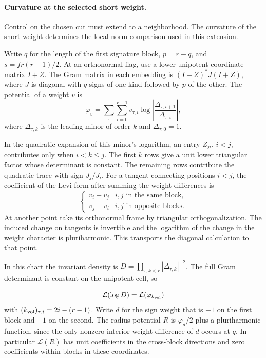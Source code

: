 \paragraph{Curvature at the selected short weight.}
\hypertarget{source-slice-short-analytic}{}

Control on the chosen cut must extend to a neighborhood. The curvature of the short weight determines the local norm comparison used in this extension.

Write \(q\) for the length of the first signature block,
\(p=r-q\), and \(s=fr(r-1)/2\). At an orthonormal flag,
use a lower unipotent coordinate matrix \(I+Z\). The
Gram matrix in each embedding is \((I+Z)^*J(I+Z)\), where
\(J\) is diagonal with \(q\) signs of one kind followed by
\(p\) of the other. The potential of a weight \(v\) is
\[
 \varphi_v=\sum_\tau\sum_{i=0}^{r-1}
               v_{\tau,i}\log\left|
                 \frac{\Delta_{\tau,i+1}}{\Delta_{\tau,i}}\right|,
\]
where \(\Delta_{\tau,k}\) is the leading minor of
order \(k\) and \(\Delta_{\tau,0}=1\).

In the quadratic expansion of this minor's logarithm,
an entry \(Z_{ji}\), \(i<j\), contributes only when
\(i<k\le j\). The first \(k\) rows give a unit lower
triangular factor whose determinant is constant. The
remaining rows contribute the quadratic trace with sign
\(J_j/J_i\). For a tangent connecting positions \(i<j\), the coefficient of the Levi form after summing the weight differences is
\[
  \begin{cases}v_i-v_j&i,j\text{ in the same block},\\v_j-v_i&i,j\text{ in opposite blocks}.\end{cases}
\]
 At another
point take its orthonormal frame by triangular
orthogonalization. The induced change on tangents is
invertible and the logarithm of the change in the weight
character is pluriharmonic. This transports the diagonal
calculation to that point.

In this chart the invariant density is
\(D=\prod_{\tau,k<r}|\Delta_{\tau,k}|^{-2}\).
The full Gram determinant is constant on the unipotent
cell, so

\[
  \mathcal L(\log D)=\mathcal L(\varphi_{k_{\rm vol}})
\]
with \((k_{\rm vol})_{\tau,i}=2i-(r-1)\). Write \(d\)
for the sign weight that is \(-1\) on the first block
and \(+1\) on the second. The radius potential \(R\)
is \(\varphi_d/2\) plus a pluriharmonic function, since
the only nonzero interior weight difference of \(d\)
occurs at \(q\). In particular \(\mathcal L(R)\) has unit
coefficients in the cross-block directions and zero
coefficients within blocks in these coordinates.
\label{cor:slice-short-analytic-1}

